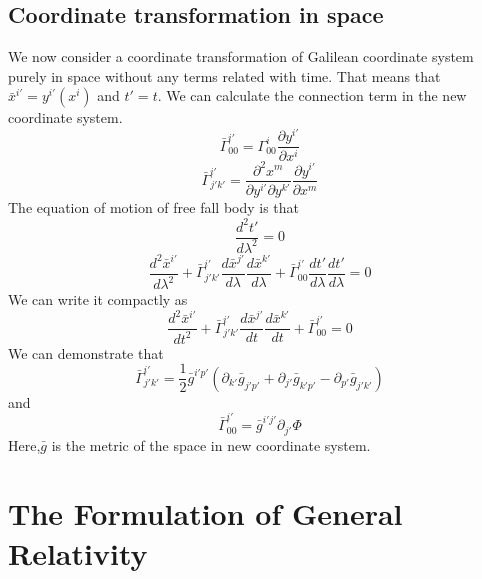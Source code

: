\documentclass{article}
\begin{document}
\subsection{Coordinate transformation in space}
We now consider a coordinate transformation of Galilean coordinate system purely in space without any terms related with time. That means that $\bar{x}^{i'} = y^{i'}(x^{i})$ and $t'=t$. We can calculate the connection term in the new coordinate system.
\[\bar{\Gamma}^{i'}_{00} = \Gamma^{i}_{00} \frac{\partial y^{i'}}{\partial x^{i}}\]
\[\bar{\Gamma}^{i'}_{j'k'} = \frac{\partial^2 x^{m}}{\partial y^{i'}\partial y^{k'}} \frac{\partial y^{i'}}{\partial x^{m}}\]
The equation of motion of free fall body is that
\[\frac{d^2 t'}{d\lambda^2} = 0\]
\[\frac{d^2 \bar{x}^{i'}}{d\lambda^2} + \bar{\Gamma}^{i'}_{j' k'} \frac{d\bar{x}^{j'}}{d \lambda} \frac{d\bar{x}^{k'}}{d \lambda} + \bar{\Gamma}^{i'}_{0 0} \frac{dt'}{d \lambda} \frac{dt'}{d \lambda}=0\]
We can write it compactly as 
\[\frac{d^2 \bar{x}^{i'}}{dt^2} + \bar{\Gamma}^{i'}_{j' k'} \frac{d\bar{x}^{j'}}{dt} \frac{d\bar{x}^{k'}}{dt} + \bar{\Gamma}^{i'}_{0 0}=0\]
We can demonstrate that
\[\bar{\Gamma}^{i'}_{j'k'} = \frac{1}{2} \bar{g}^{i'p'}(\partial_{k'}\bar{g}_{j'p'}+\partial_{j'}\bar{g}_{k'p'}-\partial_{p'}\bar{g}_{j'k'})\]
and
\[\bar{\Gamma}^{i'}_{00} = \bar{g}^{i'j'}\partial_{j'}\Phi\]
Here,$\bar{g}$ is the metric of the space in new coordinate system.

\section{The Formulation of General Relativity}
\end{document}
